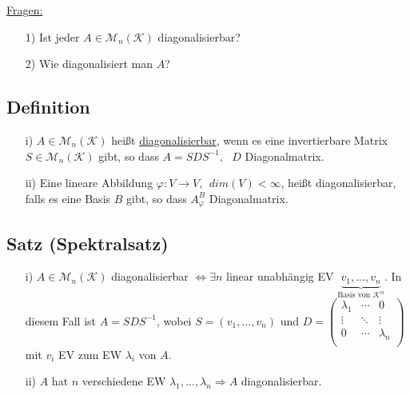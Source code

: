 \documentclass[12pt,titlepage, pdf]{article}
\newcommand{\K}{\mathcal{K}}
\newcommand{\M}{\mathcal{M}}
\newcommand{\uline}[1]{\underline{#1}}
\renewcommand{\>}{\rightarrow}
\renewcommand{\*}{\cdot}
\renewcommand{\phi}{\varphi}
\begin{document}
\underline{Fragen:}
\begin{itemize}
	\item[1)] Ist jeder $A \in \M_n(\K)$ diagonalisierbar?
	\item[2)] Wie diagonalisiert man $A$?
\end{itemize}
\subsection{Definition}
\label{9.11}
\begin{itemize}
	\item[i)] $A \in \M_n(\K)$ heißt \uline{diagonalisierbar}, wenn es eine invertierbare Matrix \\$S \in \M_n(\K)$ gibt, so dass $A = SDS^{-1},~~~ D$ Diagonalmatrix.
	\item[ii)] Eine lineare Abbildung $\phi:  V \rightarrow V,~~ dim(V) < \infty$, heißt diagonalisierbar, falls es eine Basis $B$ gibt, so dass $A_\phi^B$ Diagonalmatrix.
\end{itemize}
\subsection{Satz (Spektralsatz)}
\begin{itemize}
	\item[i)] $A \in \M_n(\K)$ diagonalisierbar $\Leftrightarrow \exists n$ linear unabhängig EV $\underbrace{v_1,...,v_n}_{\text{Basis von }\K^n}$. In diesem Fall ist $A = SDS^{-1}$, wobei $S = (v_1,...,v_n)$ und $D = \begin{pmatrix}
	\lambda_1 & \cdots & 0 \\
	\vdots & \ddots & \vdots \\
	0 & \cdots & \lambda_n \\
	\end{pmatrix}$ mit $v_i$ EV zum EW $\lambda_i$ von $A$.
	\item[ii)] $A$ hat $n$ verschiedene EW $\lambda_1,...,\lambda_n \Rightarrow A$ diagonalisierbar.
\end{itemize}
\end{document}
